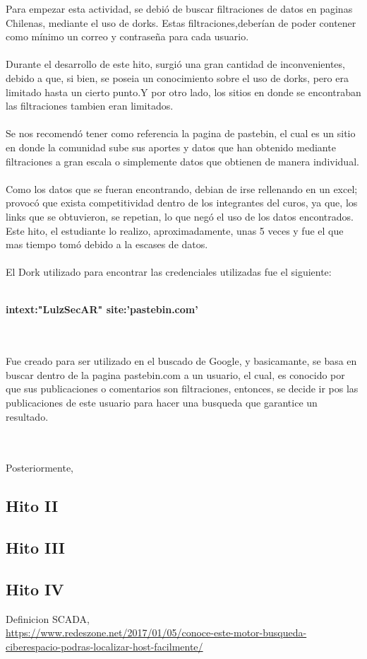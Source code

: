 \documentclass[]{article}
\begin{document}
    Para empezar esta actividad, se debió de buscar filtraciones de datos en paginas Chilenas, mediante el uso de dorks.
     Estas filtraciones,deberían de poder contener como mínimo un correo y contraseña para cada usuario.      
    \\\\
    Durante el desarrollo de este hito, surgió una gran cantidad de inconvenientes, debido a que, si bien, se poseia un conocimiento
    sobre el uso de dorks, pero era limitado hasta un cierto punto.Y por otro lado, los sitios en donde se encontraban las filtraciones
    tambien eran limitados.
    \\\\
    Se nos recomendó tener como referencia la pagina de pastebin, el cual es un sitio en donde la comunidad sube sus aportes y datos que han
    obtenido mediante filtraciones a gran escala o simplemente datos que obtienen de manera individual.
    \\\\
    Como los datos que se fueran encontrando, debian de irse rellenando en un excel; provocó que exista competitividad dentro de los 
    integrantes del curos, ya que, los links que se obtuvieron, se repetian, lo que negó el uso de los datos encontrados. Este hito,
    el estudiante lo realizo, aproximadamente, unas 5 veces y fue el que mas tiempo tomó debido a la escases de datos. 
    \\\\
    El Dork utilizado para encontrar las credenciales utilizadas fue el siguiente:
    \\\\
    \begin{center}
        \textbf{intext:"LulzSecAR" site:'pastebin.com'}
    \end{center}
    \\\\
    Fue creado para ser utilizado en el buscado de Google, y basicamante, se basa en buscar dentro de la pagina pastebin.com a un usuario, el cual, es conocido por que sus publicaciones o
    comentarios son filtraciones, entonces, se decide ir pos las publicaciones de este usuario para hacer una busqueda que garantice
    un resultado. 

    \\\\
    Posteriormente, 

    

\newpage

\subsection{Hito II}

\subsection{Hito III}

\subsection{Hito IV}



Definicion SCADA,
\\\url{https://www.redeszone.net/2017/01/05/conoce-este-motor-busqueda-ciberespacio-podras-localizar-host-facilmente/}
\\
\end{document}
